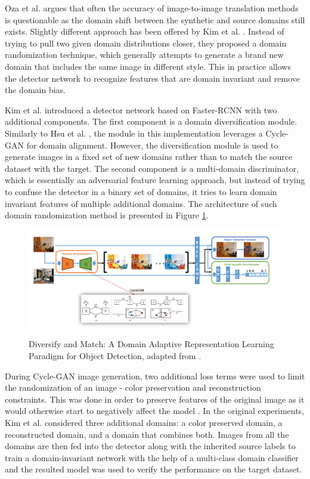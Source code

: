 Oza et al. \cite{Oza2021} argues that often the accuracy of image-to-image translation methods is questionable as the domain shift between the synthetic and source domains still exists. Slightly different approach has been offered by Kim et al. \cite{Kim2019}. Instead of trying to pull two given domain distributions closer, they proposed a domain randomization technique, which generally attempts to generate a brand new domain that includes the same image in different style. This in practice allows the detector network to recognize features that are domain invariant and remove the domain bias. 

Kim et al. introduced a detector network based on Faster-RCNN with two additional components. The first component is a domain diversification module. Similarly to Hsu et al. \cite{Hsu2019}, the module in this implementation leverages a Cycle-GAN \cite{Zhu2017} for domain alignment. However, the diversification module is used to generate images in a fixed set of new domains rather than to match the source dataset with the  target.  The second component is a multi-domain discriminator, which is essentially an adversarial feature learning approach, but instead of trying to confuse the detector in a binary set of domains, it tries to learn domain invariant features of multiple additional domains. The architecture of such domain randomization method is presented in Figure \ref{diversify}.

\begin{figure}[htb]
	\begin{center}
		\includegraphics[width=16cm]{./diversify.png}
	\end{center}
	\caption{Diversify and Match: A Domain Adaptive Representation Learning Paradigm for Object Detection, adapted from \cite{Kim2019}.}
	\begin{center}
		\label{diversify}
	\end{center}
\end{figure}

During Cycle-GAN image generation, two additional loss terms were used to limit the  randomization of an image - color preservation and reconstruction constraints. This was done in order to preserve features of the original image as it would otherwise start to negatively affect the model \cite{Oza2021}. In the original experiments,  Kim et al. considered three additional domains: a color preserved domain, a reconstructed domain, and a domain that combines both. Images from all the domains are then fed into the detector along with the inherited source labels to train a domain-invariant network with the help of a multi-class domain classifier and the resulted model was used to verify the performance on the target dataset. 
\FloatBarrier

